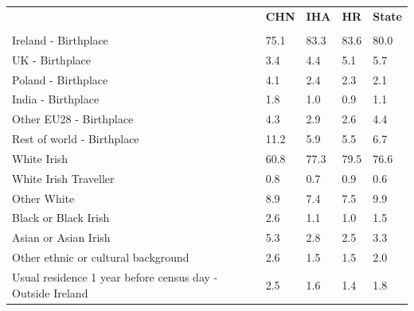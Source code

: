 \documentclass{article}
\begin{document}
\pagebreak
\begin{table}[h]	
\centering
		\begin{tabular}{KTTTT}
  \hline
& \textbf{CHN} & \textbf{IHA} & \textbf{HR}& \textbf{State}\\ 
  \hline
    \\ 
    \hline
Ireland - Birthplace & 75.1& 83.3& 83.6& 80.0\\
UK - Birthplace & 3.4& 4.4& 5.1& 5.7\\
Poland - Birthplace & 4.1& 2.4& 2.3& 2.1\\
India - Birthplace & 1.8& 1.0& 0.9& 1.1\\
Other EU28 - Birthplace & 4.3& 2.9& 2.6& 4.4\\
Rest of world - Birthplace & 11.2&  5.9&  5.5&  6.7\\
    \hline
White Irish & 60.8& 77.3& 79.5& 76.6\\
White Irish Traveller & 0.8& 0.7& 0.9& 0.6\\
Other White & 8.9& 7.4& 7.5& 9.9\\
Black or Black Irish & 2.6& 1.1& 1.0& 1.5\\
Asian or Asian Irish & 5.3& 2.8& 2.5& 3.3\\
Other ethnic or cultural background & 2.6& 1.5& 1.5& 2.0\\
    \hline
Usual residence 1 year before census day - Outside Ireland & 2.5& 1.6& 1.4& 1.8\\


\end{tabular}
\end{table}
\end{document}
